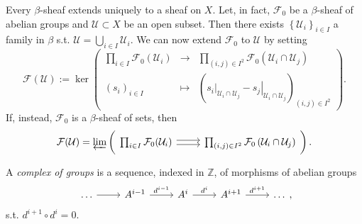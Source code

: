 \documentclass[../Main]{subfiles}
\begin{document}
\begin{rem}[]
Every $\beta$-sheaf extends uniquely to a sheaf on $X$.
Let, in fact, $\mathcal{F}_0$ be a $\beta$-sheaf of abelian groups
and $\mathcal{U} \subset X$ be an open subset.
Then there exists $\left\{ \mathcal{U}_i \right\}_{i \in I}$ a family in $\beta$
s.t. $\mathcal{U} = \bigcup_{i \in I} \mathcal{U}_i$.
We can now extend $\mathcal{F}_0$ to $\mathcal{U}$ by setting
\begin{equation}
	\mathcal{F}(\mathcal{U}) :=
	\ker
	\begin{pmatrix}
		\prod_{i \in I} \mathcal{F}_0(\mathcal{U}_i) &\longrightarrow &
		\prod_{\left(i, j\right) \in I^2} \mathcal{F}_0 \left( 
		\mathcal{U}_i \cap \mathcal{U}_j \right) \\
		\left( s_i \right)_{i \in I} &\longmapsto &
		\left( \left.s_i\right|_{\mathcal{U}_i \cap \mathcal{U}_j} -
		\left.s_j\right|_{\mathcal{U}_i \cap \mathcal{U}_j} \right)_{\left(i, j\right) \in I^2}
	\end{pmatrix} 
.\end{equation} 
If, instead, $\mathcal{F}_0$ is a $\beta$-sheaf of sets, then
\begin{equation}
	\mathcal{F}(\mathcal{U}) = 
	\varprojlim \left(  
		\begin{tikzcd}
		\prod_{i \in I} \mathcal{F}_0(\mathcal{U}_i)
		\arrow[r, "", rightarrow, shift left=.5ex] \arrow[r, "", rightarrow, shift right=.5ex] &
		\prod_{\left(i, j\right) \in I^2} \mathcal{F}_0 \left( 
		\mathcal{U}_i \cap \mathcal{U}_j \right)
		\end{tikzcd}
	\right)
.\end{equation} 
\end{rem}

\begin{defn}
	A {\em complex of groups} is a sequence, indexed in $\mathbb{Z}$, 
	of morphisms of abelian groups
	\begin{equation}
	\begin{tikzcd}
		\ldots \arrow[r, "", rightarrow] &
		A^{i-1} \arrow[r, "d^{i-1}", rightarrow] &
		A^{i} \arrow[r, "d^{i}", rightarrow] &
		A^{i+1} \arrow[r, "d^{i+1}", rightarrow] &
		\ldots
	\end{tikzcd}
	,\end{equation} 
	s.t. $d^{i+1} \circ d^i = 0$.
\end{defn}
\end{document}
